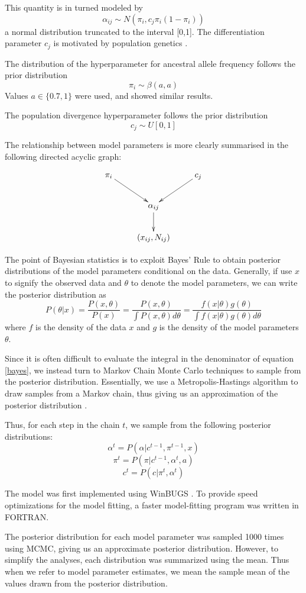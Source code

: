 \documentclass[a4paper,12pt]{article}
\begin{document}
This quantity is in turned modeled by
$$\alpha_{ij}\sim N(\pi_i, c_j\pi_i(1-\pi_i))$$
a normal distribution truncated to the interval [0,1]. The
differentiation parameter $c_j$ is motivated by population genetics
\cite[section 2.2]{nicholson}.

The distribution of the hyperparameter for ancestral allele frequency
follows the prior distribution
$$\pi_i\sim \beta(a,a)$$
Values $a\in\{0.7,1\}$ were used, and showed similar results.

The population divergence hyperparameter follows the prior
distribution $$c_j\sim U[0,1]$$

The relationship between model parameters is more clearly summarised
in the following directed acyclic graph:

$$
\xymatrix{
  \pi_i \ar[rd] & & c_j \ar[ld] \\
  & \alpha_{ij} \ar[d] & \\
  & (x_{ij},N_{ij})
}
$$

The point of Bayesian statistics is to exploit Bayes' Rule to obtain
posterior distributions of the model parameters conditional on the
data. Generally, if use $x$ to signify the observed data and $\theta$
to denote the model parameters, we can write the posterior
distribution as
\begin{equation}
\label{bayes}
P(\theta|x) = \frac{P(x,\theta)}{P(x)} = 
\frac{P(x,\theta)}{\int P(x,\theta)d\theta} =
\frac{f(x|\theta)g(\theta)}{\int f(x|\theta)g(\theta)d\theta}
\end{equation}
where $f$ is the density of the data $x$ and $g$ is the density of the
model parameters $\theta$.

Since it is often difficult to evaluate the integral in the
denominator of equation \ref{bayes}, we instead turn to Markov Chain
Monte Carlo techniques to sample from the posterior
distribution. Essentially, we use a Metropolis-Hastings algorithm to
draw samples from a Markov chain, thus giving us an approximation of
the posterior distribution \cite{hastings}.

Thus, for each step in the chain $t$, we sample from the following
posterior distributions:
$$\alpha^t = P(\alpha|c^{t-1},\pi^{t-1},x)$$
$$\pi^t = P(\pi|c^{t-1},\alpha^t,a)$$
$$c^t = P(c|\pi^t,\alpha^t)$$

The model was first implemented using WinBUGS \cite{winbugs}. To
provide speed optimizations for the model fitting, a faster
model-fitting program was written in FORTRAN.

The posterior distribution for each model parameter was sampled 1000
times using MCMC, giving us an approximate posterior
distribution. However, to simplify the analyses, each distribution was
summarized using the mean. Thus when we refer to model parameter
estimates, we mean the sample mean of the values drawn from the
posterior distribution.
\end{document}
